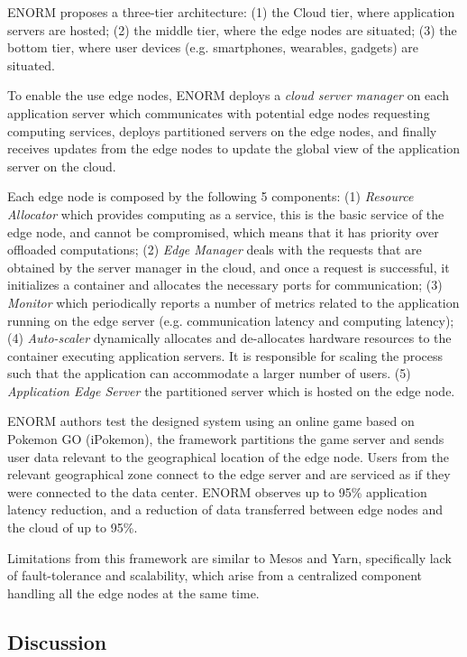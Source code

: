 ENORM proposes a three-tier architecture: (1) the Cloud tier, where application servers are hosted; (2) the middle tier, where the edge nodes are situated; (3) the bottom tier, where user devices (e.g. smartphones, wearables, gadgets) are situated. 

To enable the use edge nodes, ENORM deploys a \textit{cloud server manager} on each application server which communicates with potential edge nodes requesting computing services, deploys partitioned servers on the edge nodes, and finally receives updates from the edge nodes to update the global view of the application server on the cloud.

Each edge node is composed by the following 5 components: (1) \textit{Resource Allocator} which provides computing as a service, this is the basic service of the edge node, and cannot be compromised, which means that it has priority over offloaded computations; (2) \textit{Edge Manager} deals with the requests that are obtained by the server manager in the cloud, and once a request is successful, it initializes a container and allocates the necessary ports for communication; (3) \textit{Monitor} which periodically reports a number of metrics related to the application running on the edge server (e.g. communication latency and computing latency); (4) \textit{Auto-scaler} dynamically allocates and de-allocates hardware resources to the container executing application servers. It is responsible for scaling the process such that the application can accommodate a larger number of users. (5) \textit{Application Edge Server} the partitioned server which is hosted on the edge node.

ENORM authors test the designed system using an online game based on Pokemon GO (iPokemon)\cite{pokemonGo}, the framework partitions the game server and sends  user data relevant to the geographical location of the edge node. Users from the relevant geographical zone connect to the edge server and are serviced as if they were connected to the data center. ENORM observes up to 95\% application latency reduction, and a reduction of data transferred between edge nodes and the cloud of up to 95\%.

Limitations from this framework are similar to Mesos and Yarn, specifically lack of fault-tolerance and scalability, which arise from a centralized component handling all the edge nodes at the same time. 

\subsection{Discussion}

